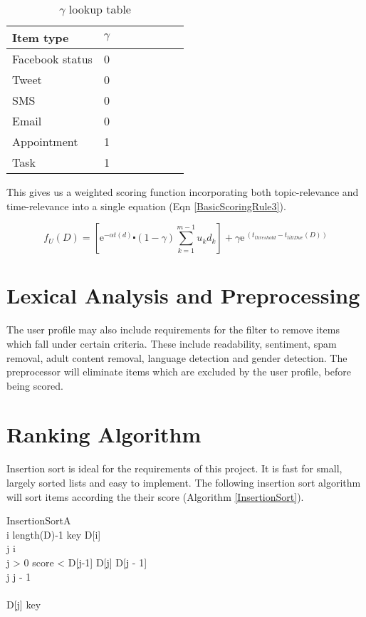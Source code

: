 \begin{table}\label{BetaLookup}
\begin{center}
	\begin{tabular}{l*{6}{c}r}
		Item type        & $\gamma$ \\
		\hline
		Facebook status  & 0 \\
		Tweet            & 0 \\
		SMS          	 & 0 \\
		Email    		 & 0 \\
		Appointment      & 1 \\
		Task		     & 1 \\
	\end{tabular}
	\caption{$\gamma$ lookup table}
\end{center}
\end{table}

This gives us a weighted scoring function incorporating both topic-relevance and time-relevance into a single equation (Eqn \ref{BasicScoringRule3}).

\begin{equation}\label{BasicScoringRule3}
	f_U (D) = \left[{\mathrm{e}}^{-\alpha t(d)} \centerdot (1-\gamma) \sum_{k=1}^{m-1} u_kd_k \right] + \gamma{\mathrm{e}}^{\ (t_{threshold}-t_{tillDue}(D))}
\end{equation}

\section{Lexical Analysis and Preprocessing}

The user profile may also include requirements for the filter to remove items which fall under certain criteria. These include readability, sentiment, spam removal, adult content removal, language detection and gender detection. The preprocessor will eliminate items which are excluded by the user profile, before being scored. 

\section{Ranking Algorithm}

Insertion sort is ideal for the requirements of this project. It is fast for small, largely sorted lists and easy to implement. The following insertion sort algorithm will sort items according the their score (Algorithm \ref{InsertionSort}).

\begin{pseudocode}{InsertionSort}{A}
	\label{InsertionSort}
	\\
	\FOR i \TO length(D)-1 \DO
	\BEGIN
		key \GETS D[i]\\
		j \GETS i\\
		\WHILE j > 0 \AND score < D[j-1] \DO
		\BEGIN
			D[j] \GETS D[j - 1]\\
			j \GETS j - 1\\
		\END \\
		D[j] \GETS key \\
	\END	
		
\end{pseudocode}